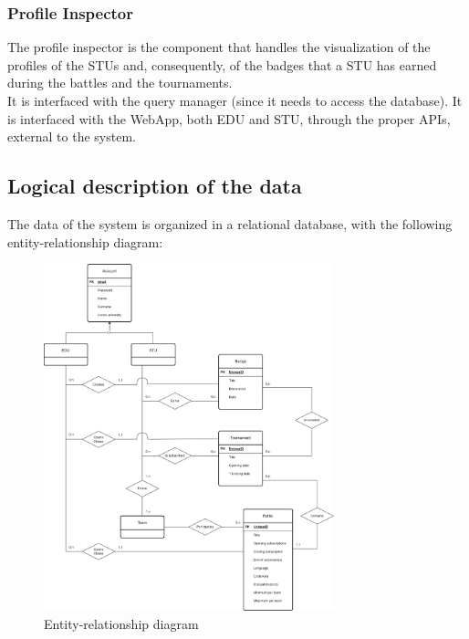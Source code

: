 \subsubsection*{Profile Inspector}
The profile inspector is the component that handles the visualization of the profiles of the STUs and, consequently, of the badges that a STU has earned during the battles and the tournaments.\\
It is interfaced with the query manager (since it needs to access the database).
It is interfaced with the WebApp, both EDU and STU, through the proper APIs, external to the system.

\subsection{Logical description of the data}
The data of the system is organized in a relational database, with the following entity-relationship diagram:

\begin{figure}[H]
    \centering
    \includegraphics[width=0.75\textwidth]{images/diagrams/er_diagram.png}
    \caption{Entity-relationship diagram}
    \label{fig:er_diagram}
\end{figure}

